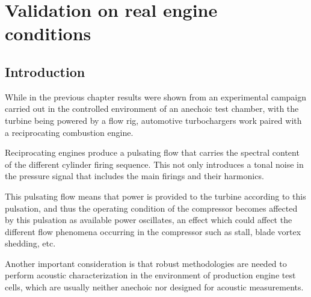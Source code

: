 \chapter{Validation on real engine conditions}
\label{cap:engine}


\section{Introduction}\label{sec:intro}
While in the previous chapter results were shown from an experimental campaign carried out in the controlled environment of an anechoic test chamber, with the turbine being powered by a flow rig, automotive turbochargers work paired with a reciprocating combustion engine.

Reciprocating engines produce a pulsating flow that carries the spectral content of the different cylinder firing sequence. This not only introduces a tonal noise in the pressure signal that includes the main firings and their harmonics.

This pulsating flow means that power is provided to the turbine according to this pulsation, and thus the operating condition of the compressor becomes affected by this pulsation as available power oscillates, an effect which could affect the different flow phenomena occurring in the compressor such as stall, blade vortex shedding, etc.

Another important consideration is that robust methodologies are needed to perform acoustic characterization in the environment of production engine test cells, which are usually neither anechoic nor designed for acoustic measurements.


